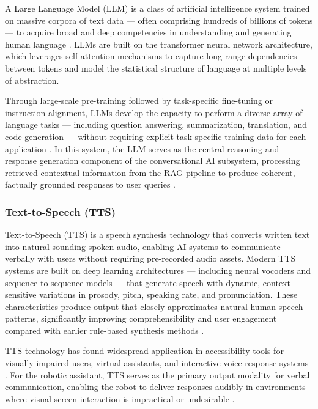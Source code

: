 A Large Language Model (LLM) is a class of artificial intelligence system trained on massive corpora of text data — often comprising hundreds of billions of tokens — to acquire broad and deep competencies in understanding and generating human language \cite{cloudflare}. LLMs are built on the transformer neural network architecture, which leverages self-attention mechanisms to capture long-range dependencies between tokens and model the statistical structure of language at multiple levels of abstraction.

Through large-scale pre-training followed by task-specific fine-tuning or instruction alignment, LLMs develop the capacity to perform a diverse array of language tasks — including question answering, summarization, translation, and code generation — without requiring explicit task-specific training data for each application \cite{pymnts2025}. In this system, the LLM serves as the central reasoning and response generation component of the conversational AI subsystem, processing retrieved contextual information from the RAG pipeline to produce coherent, factually grounded responses to user queries \cite{ollama2024}.

\subsubsection{Text-to-Speech (TTS)}

Text-to-Speech (TTS) is a speech synthesis technology that converts written text into natural-sounding spoken audio, enabling AI systems to communicate verbally with users without requiring pre-recorded audio assets. Modern TTS systems are built on deep learning architectures — including neural vocoders and sequence-to-sequence models — that generate speech with dynamic, context-sensitive variations in prosody, pitch, speaking rate, and pronunciation. These characteristics produce output that closely approximates natural human speech patterns, significantly improving comprehensibility and user engagement compared with earlier rule-based synthesis methods \cite{aws,botnoi2024}.

TTS technology has found widespread application in accessibility tools for visually impaired users, virtual assistants, and interactive voice response systems \cite{coursearc}. For the robotic assistant, TTS serves as the primary output modality for verbal communication, enabling the robot to deliver responses audibly in environments where visual screen interaction is impractical or undesirable \cite{botnoi_tts}.


